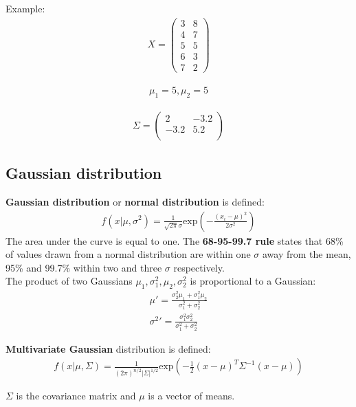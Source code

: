 \documentclass{report}
\begin{document}
Example:
\begin{align*}
X = \begin{pmatrix}
3 & 8\\
4 & 7\\
5 & 5\\
6 & 3\\
7 & 2
\end{pmatrix}
\end{align*}

\begin{align*}
\mu_1 = 5, \mu_2 = 5
\end{align*}

\begin{align*}
\Sigma = \begin{pmatrix}
2 & -3.2\\
-3.2 & 5.2\\
\end{pmatrix}
\end{align*}


\subsection{Gaussian distribution}
{\bf Gaussian distribution} or {\bf normal distribution} is defined:
\begin{align*}
f(x\vert \mu,\sigma^2)= \frac{1}{\sqrt{2\pi}\sigma}\mbox{exp}(-\frac{(x_i-\mu)^2}{2\sigma^2})
\end{align*}
The area under the curve is equal to one. The {\bf 68-95-99.7 rule} states that 68\% of values drawn from a normal distribution are within one $\sigma$ away from the mean, 95\% and 99.7\% within two and three $\sigma$ respectively.
\\
The product of two Gaussians $\mu_1, \sigma_1^2, \mu_2, \sigma_2^2$ is proportional to a Gaussian:
\begin{align*}
\mu\prime = \frac{\sigma_2^2\mu_1 + \sigma_1^2\mu_2}{\sigma_1^2 + \sigma_2^2} \\
\sigma^{2}\prime = \frac{\sigma_1^2\sigma_2^2}{\sigma_1^2+\sigma_2^2}
\end{align*}


{\bf Multivariate Gaussian} distribution is defined:
\begin{align*}
f(x\vert \mu,\Sigma)=\frac{1}{(2\pi)^{n/2}\vert \Sigma \vert ^{1/2}}\mbox{exp}(-\frac{1}{2}(x-\mu)^T \Sigma^{-1}(x-\mu))
\end{align*}

$\Sigma$ is the covariance matrix and $\mu$ is a vector of means.
\end{document}
